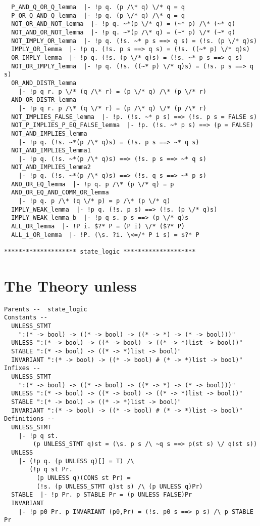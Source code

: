 {\begin{verbatim}
  P_AND_Q_OR_Q_lemma  |- !p q. (p /\* q) \/* q = q
  P_OR_Q_AND_Q_lemma  |- !p q. (p \/* q) /\* q = q
  NOT_OR_AND_NOT_lemma  |- !p q. ~*(p \/* q) = (~* p) /\* (~* q)
  NOT_AND_OR_NOT_lemma  |- !p q. ~*(p /\* q) = (~* p) \/* (~* q)
  NOT_IMPLY_OR_lemma  |- !p q. (!s. ~* p s ==> q s) = (!s. (p \/* q)s)
  IMPLY_OR_lemma  |- !p q. (!s. p s ==> q s) = (!s. ((~* p) \/* q)s)
  OR_IMPLY_lemma  |- !p q. (!s. (p \/* q)s) = (!s. ~* p s ==> q s)
  NOT_OR_IMPLY_lemma  |- !p q. (!s. ((~* p) \/* q)s) = (!s. p s ==> q s)
  OR_AND_DISTR_lemma
    |- !p q r. p \/* (q /\* r) = (p \/* q) /\* (p \/* r)
  AND_OR_DISTR_lemma
    |- !p q r. p /\* (q \/* r) = (p /\* q) \/* (p /\* r)
  NOT_IMPLIES_FALSE_lemma  |- !p. (!s. ~* p s) ==> (!s. p s = FALSE s)
  NOT_P_IMPLIES_P_EQ_FALSE_lemma  |- !p. (!s. ~* p s) ==> (p = FALSE)
  NOT_AND_IMPLIES_lemma
    |- !p q. (!s. ~*(p /\* q)s) = (!s. p s ==> ~* q s)
  NOT_AND_IMPLIES_lemma1
    |- !p q. (!s. ~*(p /\* q)s) ==> (!s. p s ==> ~* q s)
  NOT_AND_IMPLIES_lemma2
    |- !p q. (!s. ~*(p /\* q)s) ==> (!s. q s ==> ~* p s)
  AND_OR_EQ_lemma  |- !p q. p /\* (p \/* q) = p
  AND_OR_EQ_AND_COMM_OR_lemma
    |- !p q. p /\* (q \/* p) = p /\* (p \/* q)
  IMPLY_WEAK_lemma  |- !p q. (!s. p s) ==> (!s. (p \/* q)s)
  IMPLY_WEAK_lemma_b  |- !p q s. p s ==> (p \/* q)s
  ALL_OR_lemma  |- !P i. $?* P = (P i) \/* ($?* P)
  ALL_i_OR_lemma  |- !P. (\s. ?i. \<=/* P i s) = $?* P
  
******************** state_logic ********************
\end{verbatim}

\section*{The Theory unless}

\begin{verbatim}
Parents --  state_logic     
Constants --
  UNLESS_STMT
    ":(* -> bool) -> ((* -> bool) -> ((* -> *) -> (* -> bool)))"
  UNLESS ":(* -> bool) -> ((* -> bool) -> ((* -> *)list -> bool))"
  STABLE ":(* -> bool) -> ((* -> *)list -> bool)"
  INVARIANT ":(* -> bool) -> ((* -> bool) # (* -> *)list -> bool)"     
Infixes --
  UNLESS_STMT
    ":(* -> bool) -> ((* -> bool) -> ((* -> *) -> (* -> bool)))"
  UNLESS ":(* -> bool) -> ((* -> bool) -> ((* -> *)list -> bool))"
  STABLE ":(* -> bool) -> ((* -> *)list -> bool)"
  INVARIANT ":(* -> bool) -> ((* -> bool) # (* -> *)list -> bool)"     
Definitions --
  UNLESS_STMT
    |- !p q st.
        (p UNLESS_STMT q)st = (\s. p s /\ ~q s ==> p(st s) \/ q(st s))
  UNLESS
    |- (!p q. (p UNLESS q)[] = T) /\
       (!p q st Pr.
         (p UNLESS q)(CONS st Pr) =
         (!s. (p UNLESS_STMT q)st s) /\ (p UNLESS q)Pr)
  STABLE  |- !p Pr. p STABLE Pr = (p UNLESS FALSE)Pr
  INVARIANT
    |- !p p0 Pr. p INVARIANT (p0,Pr) = (!s. p0 s ==> p s) /\ p STABLE Pr
  

\end{verbatim}}

